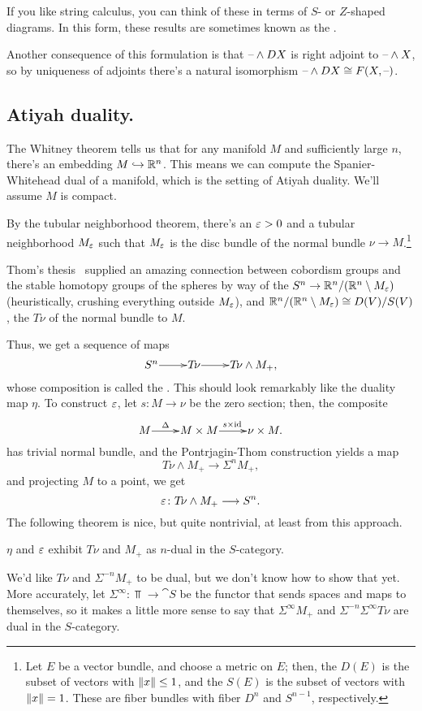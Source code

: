 If you like string calculus, you can think of these in terms of $S$- or $Z$-shaped diagrams. In this form, these
results are sometimes known as the .

Another consequence of this formulation is that $\text{--}\wedge DX$ is right adjoint to $\text{--}\wedge X$, so by uniqueness
of adjoints there's a natural isomorphism $\text{--}\wedge DX\cong F(X,\text{--})$.
\subsection*{Atiyah duality.}
The Whitney theorem tells us that for any manifold $M$ and sufficiently large $n$, there's an embedding
$M\hookrightarrow\mathbb R^n$. This means we can compute the Spanier-Whitehead dual of a manifold, which is the setting of Atiyah
duality. We'll assume $M$ is compact.

By the tubular neighborhood theorem, there's an $\varepsilon > 0$ and a tubular neighborhood $M_\varepsilon$ such that $M_\varepsilon$ is the
disc bundle of the normal bundle $\nu\to M$.\footnote{Let $E$ be a vector bundle, and choose a metric on $E$; then,
the  $D(E)$ is the subset of vectors with $\lVert x\rVert\le 1$, and the  $S(E)$ is
the subset of vectors with $\lVert x\rVert = 1$. These are fiber bundles with fiber $D^n$ and $S^{n-1}$, respectively.}

Thom's thesis~\cite{ThomThesis} supplied an amazing connection between cobordism groups and the stable homotopy
groups of the spheres by way of the  $S^n\to \mathbb R^n/(\mathbb R^n\setminus M_\varepsilon)$ (heuristically,
crushing everything outside $M_\varepsilon$), and $\mathbb R^n/(\mathbb R^n\setminus M_\varepsilon)\cong D(V)/S(V)$, the  $T\!\nu$
of the normal bundle to $M$.

Thus, we get a sequence of maps
\[\xymatrix@1{
	S^n\ar[r] & T\!\nu\ar[r] & T\!\nu\wedge M_+,
}\]
whose composition is called the . This should look remarkably like the duality map $\eta$. To
construct $\varepsilon$, let $s\colon M\to\nu$ be the zero section; then, the composite
\[\xymatrix@1{
	M\ar[r]^-\Delta & M\times M\ar[r]^{s\times\id} &\nu\times M.
}\]
has trivial normal bundle, and the Pontrjagin-Thom construction yields a map
\[T\!\nu\wedge M_+\longrightarrow\Sigma^n M_+,\]
and projecting $M$ to a point, we get
\[\varepsilon\colon T\!\nu\wedge M_+\longrightarrow S^n.\]
The following theorem is nice, but quite nontrivial, at least from this approach.
\begin{thm}
\label{atiyah_duality}
$\eta$ and $\varepsilon$ exhibit $T\!\nu$ and $M_+$ as $n$-dual in the $S$-category.
\end{thm}
We'd like $T\!\nu$ and $\Sigma^{-n}M_+$ to be dual, but we don't know how to show that yet. More accurately, let
$\Sigma^\infty\colon\Top\to\cat S$ be the functor that sends spaces and maps to themselves, so it makes a little
more sense to say that $\Sigma^\infty M_+$ and $\Sigma^{-n}\Sigma^\infty T\!\nu$ are dual in the $S$-category.

